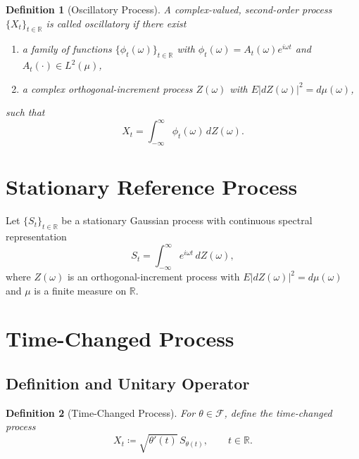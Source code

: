 \documentclass[11pt]{article}
\newtheorem{definition}{Definition}
\begin{document}
\begin{definition}[Oscillatory Process]\label{def:oscillatory}
A complex-valued, second-order process $\{X_t\}_{t\in\mathbb{R}}$ is called \emph{oscillatory} if there exist
\begin{enumerate}[label=(\roman*)]
    \item a family of functions $\{\phi_t(\omega)\}_{t\in\mathbb{R}}$ with $\phi_t(\omega)=A_t(\omega)e^{i\omega t}$ and $A_t(\cdot)\in L^2(\mu)$,
    \item a complex orthogonal-increment process $Z(\omega)$ with $E\lvert dZ(\omega)\rvert^2=d\mu(\omega)$,
\end{enumerate}
such that
\begin{equation}\label{eq:oscillatory_rep}
    X_t=\int_{-\infty}^{\infty}\phi_t(\omega)\,dZ(\omega).
\end{equation}
\end{definition}

\section{Stationary Reference Process}\label{sec:stationary}

Let $\{S_t\}_{t\in\mathbb{R}}$ be a stationary Gaussian process with continuous spectral representation
\begin{equation}\label{eq:stationary_rep}
    S_t=\int_{-\infty}^{\infty}e^{i\omega t}\,dZ(\omega),
\end{equation}
where $Z(\omega)$ is an orthogonal-increment process with $E\lvert dZ(\omega)\rvert^2=d\mu(\omega)$ and $\mu$ is a finite measure on $\mathbb{R}$.

\section{Time-Changed Process}\label{sec:time_change}

\subsection{Definition and Unitary Operator}

\begin{definition}[Time-Changed Process]\label{def:time_changed_proc}
For $\theta\in\mathcal{F}$, define the time-changed process
\begin{equation}\label{eq:time_change}
    X_t \coloneqq \sqrt{\theta'(t)}\,S_{\theta(t)}, \qquad t\in\mathbb{R}.
\end{equation}
\end{definition}
\end{document}
